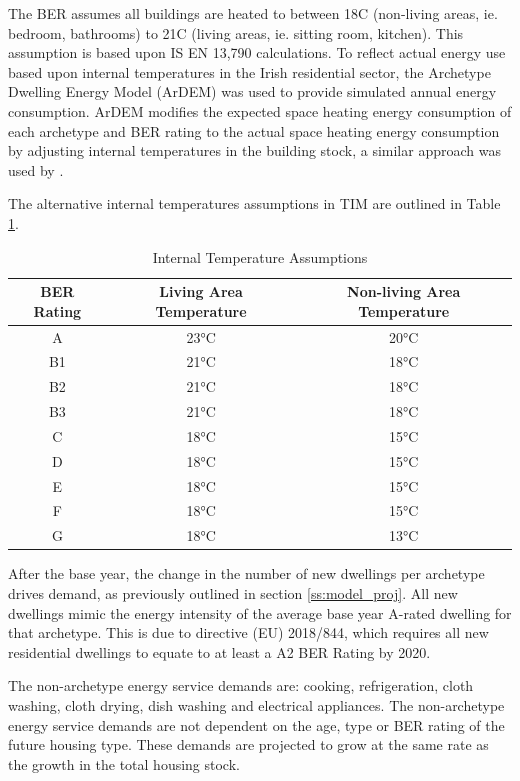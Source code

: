 \documentclass[gmd,manuscript]{copernicus}
\begin{document}
The BER assumes all buildings are heated to between 18\textdegree C (non-living areas, ie. bedroom, bathrooms) to 21\textdegree C (living areas, ie. sitting room, kitchen). This assumption is based upon IS EN 13,790 calculations. To reflect actual energy use based upon internal temperatures in the Irish residential sector, the Archetype Dwelling Energy Model (ArDEM) \citep{Dineen2015} was used to provide simulated annual energy consumption. ArDEM modifies the expected space heating energy consumption of each archetype and BER rating to the actual space heating energy consumption by adjusting internal temperatures in the building stock, a similar approach was used by \citet{Uidhir2020}.

The alternative internal temperatures assumptions in TIM are outlined in Table \ref{Internal Temperature Assumptions}. 

\begin{table}[ht]
 \centering
 \footnotesize
 \caption{Internal Temperature Assumptions}
 \begin{tabular}{ccc}
 \hline 
 BER Rating & Living Area Temperature & Non-living Area Temperature \\
 \hline
 A & 23°C & 20°C \\
 B1 & 21°C & 18°C \\
 B2	& 21°C & 18°C \\
 B3 & 21°C & 18°C \\
 C & 18°C & 15°C \\
 D & 18°C & 15°C \\
 E & 18°C & 15°C \\
 F & 18°C & 15°C \\
 G & 18°C & 13°C \\ \hline
 \end{tabular}
 
 \label{Internal Temperature Assumptions}
\end{table}

After the base year, the change in the number of new dwellings per archetype drives demand, as previously outlined in section \ref{ss:model_proj}. All new dwellings mimic the energy intensity of the average base year A-rated dwelling for that archetype. This is due to directive (EU) 2018/844, which requires all new residential dwellings to equate to at least a A2 BER Rating by 2020. 

The non-archetype energy service demands are: cooking, refrigeration, cloth washing, cloth drying, dish washing and electrical appliances. The non-archetype energy service demands are not dependent on the age, type or BER rating of the future housing type. These demands are projected to grow at the same rate as the growth in the total housing stock. 
\end{document}
